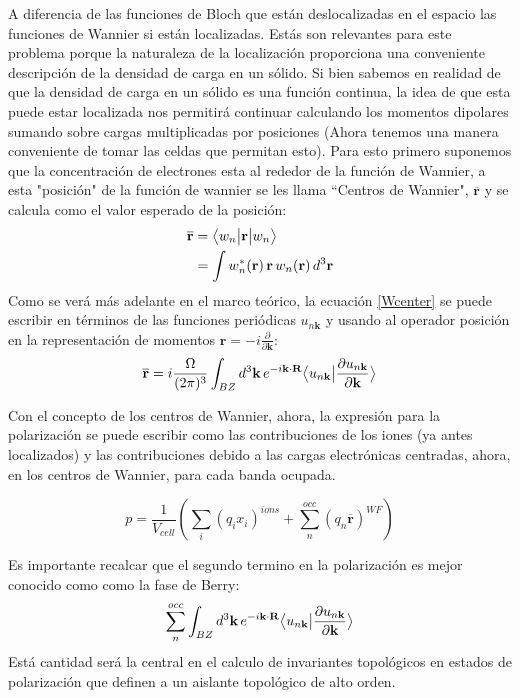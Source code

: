 A diferencia de las funciones de Bloch que están deslocalizadas en el espacio las funciones de Wannier si están localizadas. Estás son relevantes para este problema porque la naturaleza de la localización proporciona una conveniente descripción de la densidad de carga en un sólido. Si bien sabemos en
realidad de que la densidad de carga en un sólido es una función continua, la idea de que esta puede estar localizada nos permitirá continuar calculando los momentos dipolares sumando sobre cargas multiplicadas por posiciones (Ahora tenemos una manera conveniente de tomar las celdas que permitan esto).
Para esto primero suponemos que la concentración de electrones esta al rededor de la función de Wannier, a esta "posición" de la función de wannier se les llama ``Centros de Wannier", $\overline{\textbf{r}}$ y se calcula como el valor esperado de la posición:
\begin{equation}
\label{Wcenter}
\begin{split}
        \overline{\textbf{r}} &= \big \langle{w_n}\big | {\textbf{r}} \big | {w_n} \big \rangle\\
        &= \int w^*_n(\textbf{r})\,\textbf{r}\, w_n(\textbf{r})\, d^3\textbf{r}
\end{split}
\end{equation}
Como se verá más adelante en el marco teórico, la ecuación \ref{Wcenter} se puede escribir en términos de las funciones periódicas $u_{n\textbf{k}}$ y usando al operador posición en la representación de momentos $\textbf{r} = -i\frac{\partial}{\partial\textbf{k}}$:
\begin{equation}
    \overline{\textbf{r}} = i\frac{\Omega}{(2\pi)^3} \int_{BZ} d^3\textbf{k}\,e^{-i\textbf{k}\cdot\textbf{R}}\big \langle{u_{n\textbf{k}}}\big | {\frac{\partial u_{n\textbf{k}} }{\partial\textbf{k}}} \big \rangle
\end{equation}

Con el concepto de los centros de Wannier, ahora, la expresión para la polarización se puede escribir como las contribuciones de los iones (ya antes localizados) y las contribuciones debido a las cargas electrónicas centradas, ahora, en los centros de Wannier, para cada banda ocupada.

\begin{equation}
    p = \frac{1}{V_{cell}} (\sum_i (q_i x_i)^{ions} + \sum_n^{occ}(q_n \overline{\textbf{r}})^{WF})
\end{equation}

Es importante recalcar que el segundo termino en la polarización es mejor conocido como como la fase de Berry:
\begin{equation}
    \label{Barry_fase}
    \sum_n^{occ}\int_{BZ} d^3\textbf{k}\,e^{-i\textbf{k}\cdot\textbf{R}}\big \langle{u_{n\textbf{k}}}\big | {\frac{\partial u_{n\textbf{k}} }{\partial\textbf{k}}} \big \rangle
\end{equation}
Está cantidad será la central en el calculo de invariantes topológicos en estados de polarización que definen a un aislante topológico de alto orden. 


